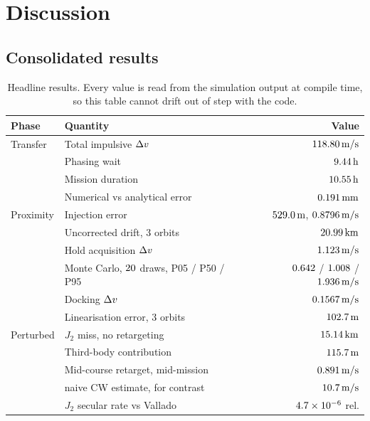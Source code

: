 \section{Discussion}
\label{sec:discussion}

\subsection{Consolidated results}

\begin{table}[htbp]
\centering
\caption{Headline results. Every value is read from the simulation output at
compile time, so this table cannot drift out of step with the code.}
\label{tab:summary}
\small
\begin{tabular}{llr}
\toprule
Phase & Quantity & Value \\
\midrule
Transfer   & Total impulsive $\Delta v$              & $118.80\,\mathrm{m/s}$ \\
           & Phasing wait                       & $9.44\,\mathrm{h}$ \\
           & Mission duration                   & $10.55\,\mathrm{h}$ \\
           & Numerical vs analytical error      & $0.191\,\mathrm{mm}$ \\
\midrule
Proximity  & Injection error                    & $529.0\,\mathrm{m}$, $0.8796\,\mathrm{m/s}$ \\
           & Uncorrected drift, 3 orbits        & $20.99\,\mathrm{km}$ \\
           & Hold acquisition $\Delta v$             & $1.123\,\mathrm{m/s}$ \\
           & \quad Monte Carlo, $20$ draws, P05 / P50 / P95 & $0.642$ / $1.008$ / $1.936\,\mathrm{m/s}$ \\
           & Docking $\Delta v$                      & $0.1567\,\mathrm{m/s}$ \\
           & Linearisation error, 3 orbits      & $102.7\,\mathrm{m}$ \\
\midrule
Perturbed  & $J_2$ miss, no retargeting         & $15.14\,\mathrm{km}$ \\
           & Third-body contribution            & $115.7\,\mathrm{m}$ \\
           & Mid-course retarget, mid-mission   & $0.891\,\mathrm{m/s}$ \\
           & \quad naive CW estimate, for contrast & $10.7\,\mathrm{m/s}$ \\
           & $J_2$ secular rate vs Vallado      & $4.7\times 10^{-6}$ rel. \\

\end{tabular}
\end{table}
